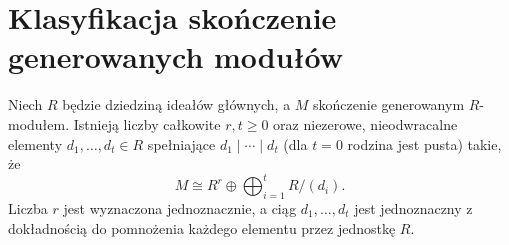 \section{Klasyfikacja skończenie generowanych modułów}
\begin{twierdzenie}
\label{aa:tw:pid-structure}
Niech $R$ będzie dziedziną ideałów głównych, a $M$
skończenie generowanym $R$-modułem. Istnieją liczby całkowite
$r,t\ge0$ oraz niezerowe, nieodwracalne elementy
$d_1,\dots,d_t\in R$ spełniające $d_1\mid\cdots\mid d_t$
(dla $t=0$ rodzina jest pusta) takie, że
\[
 M\cong R^r\oplus\bigoplus_{i=1}^t R/(d_i).
\]
Liczba $r$ jest wyznaczona jednoznacznie, a ciąg
$d_1,\dots,d_t$ jest jednoznaczny z dokładnością do
pomnożenia każdego elementu przez jednostkę $R$.
\end{twierdzenie}
